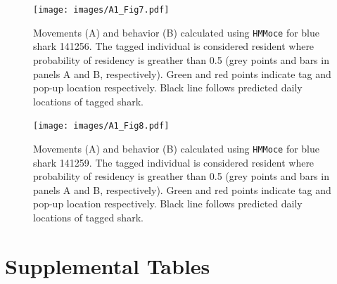 \begin{figure}[p]
\centering
\texttt{[image: images/A1\_Fig7.pdf]}
\caption[Calculated \texttt{HMMoce} tracks and behavior for blue shark 141256]{Movements (A) and behavior (B) calculated using \texttt{HMMoce} for blue shark 141256. The tagged individual is considered resident where probability of residency is greather than 0.5 (grey points and bars in panels A and B, respectively). Green and red points indicate tag and pop-up location respectively. Black line follows predicted daily locations of tagged shark.}
\label{fig:a1f7}
\end{figure}
\clearpage

\begin{figure}[p]
\centering
\texttt{[image: images/A1\_Fig8.pdf]}
\caption[Calculated \texttt{HMMoce} tracks and behavior for blue shark 141259]{Movements (A) and behavior (B) calculated using \texttt{HMMoce} for blue shark 141259. The tagged individual is considered resident where probability of residency is greather than 0.5 (grey points and bars in panels A and B, respectively). Green and red points indicate tag and pop-up location respectively. Black line follows predicted daily locations of tagged shark.}
\label{fig:a1f8}
\end{figure}
\clearpage

\section{Supplemental Tables}



